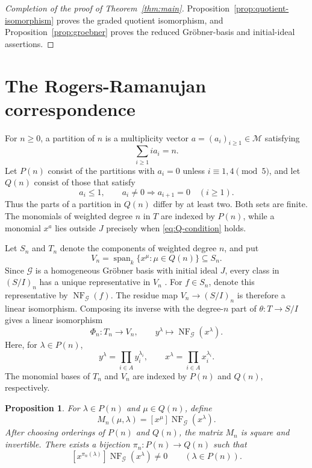 \documentclass[11pt,reqno]{amsart}
\newtheorem{proposition}[theorem]{Proposition}
\theoremstyle{definition}
\theoremstyle{remark}
\theoremstyle{plain}
\newcommand{\M}{\ensuremath{\mathcal{M}}}
\newcommand{\NF}{\operatorname{NF}}
\begin{document}
\begin{proof}[Completion of the proof of Theorem~\ref{thm:main}]
Proposition~\ref{prop:quotient-isomorphism} proves the graded
quotient isomorphism, and Proposition~\ref{prop:groebner} proves
the reduced Gr\"obner-basis and initial-ideal assertions.
\end{proof}


\section{The Rogers-Ramanujan correspondence}\label{sec:partitions}

For \(n\geq0\), a partition of \(n\) is a multiplicity vector
\(a=(a_i)_{i\geq1}\in\M\) satisfying
\[
  \sum_{i\geq1}ia_i=n.
\]
Let \(P(n)\) consist of the partitions with \(a_i=0\) unless
\(i\equiv1,4\pmod5\), and let \(Q(n)\) consist of those that satisfy
\begin{equation}\label{eq:Q-condition}
 a_i\leq1,\qquad a_i\neq0\Longrightarrow a_{i+1}=0
 \quad(i\geq1).
\end{equation}
Thus the parts of a partition in \(Q(n)\) differ by at least two.
Both sets are finite.  The monomials of weighted degree \(n\) in
\(T\) are indexed by \(P(n)\), while a monomial \(x^a\) lies outside
\(J\) precisely when \eqref{eq:Q-condition} holds.

Let \(S_n\) and \(T_n\) denote the components of weighted degree \(n\),
and put
$$
 V_n=\operatorname{span}_k\{x^\mu:\mu\in Q(n)\}\subseteq S_n.
$$
Since \(\mathcal G\) is a homogeneous Gr\"obner basis with initial
ideal \(J\), every class in \((S/I)_n\) has a unique representative
in \(V_n\) \cite[Proposition~1.14]{IimaYoshino2009}.  For \(f\in S_n\), denote this representative by
\(\NF_{\mathcal G}(f)\).  The residue map
\(V_n\to(S/I)_n\) is therefore a linear isomorphism.  Composing its
inverse with the degree-\(n\) part of \(\theta:T\to S/I\) gives a
linear isomorphism
\begin{equation}\label{eq:degree-normal-form-map}
 \Phi_n:T_n\longrightarrow V_n,\qquad
 y^\lambda\longmapsto\NF_{\mathcal G}(x^\lambda).
\end{equation}
Here, for \(\lambda\in P(n)\),
$$
 y^\lambda=\prod_{i\in A}y_i^{\lambda_i},
 \qquad
 x^\lambda=\prod_{i\in A}x_i^{\lambda_i}.
$$
The monomial bases of \(T_n\) and \(V_n\) are indexed by \(P(n)\)
and \(Q(n)\), respectively.

\begin{proposition}\label{prop:matching}
For \(\lambda\in P(n)\) and \(\mu\in Q(n)\), define
\begin{equation}\label{eq:normal-form-matrix}
 M_n(\mu,\lambda)
 =[x^\mu]\NF_{\mathcal G}(x^\lambda).
\end{equation}
After choosing orderings of \(P(n)\) and \(Q(n)\), the matrix \(M_n\)
is square and invertible.  There exists a bijection
\(\pi_n:P(n)\to Q(n)\) such that
\begin{equation}\label{eq:matching-property}
 [x^{\pi_n(\lambda)}]\NF_{\mathcal G}(x^\lambda)\neq0
 \qquad(\lambda\in P(n)).
\end{equation}
\end{proposition}
\end{document}
